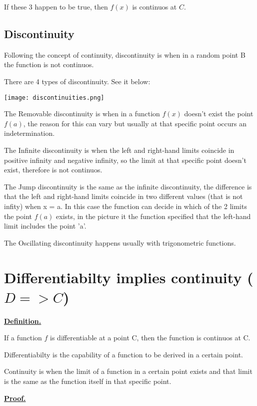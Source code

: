 \documentclass{article}
\begin{document}
If these 3 happen to be true, then $f(x)$ is continuos at $C$.

\subsection{Discontinuity}
Following the concept of continuity, discontinuity is when in a random
point B the function is not continuos.

There are 4 types of discontinuity. See it below:

\begin{center}
    \texttt{[image: discontinuities.png]}
\end{center}

The Removable discontinuity is when in a function $f(x)$ doesn't exist
the point $f(a)$, the reason for this can vary but usually at that specific
point occurs an indetermination.

The Infinite discontinuity is when the left and right-hand limits coincide
in positive infinity and negative infinity, so the limit at that specific
point doesn't exist, therefore is not continuos.

The Jump discontinuity is the same as the infinite discontinuity, the difference
is that the left and right-hand limits coincide in two different values (that is not infity) 
when x = a. In this case the function can decide in which of the 2 limits
the point $f(a)$ exists, in the picture it the function specified that
the left-hand limit includes the point 'a'.

The Oscillating discontinuity happens usually with trigonometric functions.

\newpage
\thispagestyle{headings}

\section{Differentiabilty implies continuity ($D => C$)}
\underline{\textbf{Definition.}}

\noindent
If a function $f$ is differentiable at
a point C, then the function is continuos at C.

Differentiabilty is the capability of a function to be derived in a 
certain point.

Continuity is when the limit of a function in a certain point exists
and that limit is the same as the function itself in that specific point.

\noindent
\underline{\textbf{Proof.}}
\end{document}
